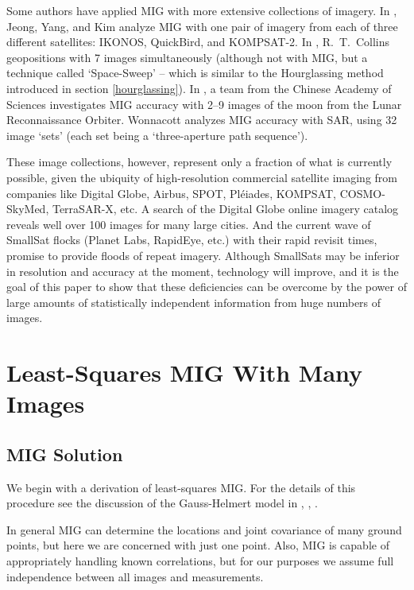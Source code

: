 \documentclass[10pt]{amsart}
\begin{document}
Some authors have applied MIG with more extensive collections of imagery. In
\cite{JEONG_SIX}, Jeong, Yang, and Kim analyze MIG with one pair of imagery from
each of three different satellites: IKONOS, QuickBird, and KOMPSAT-2. In
\cite{PLANE_COLLINS}, R.~T.~Collins geopositions with 7 images simultaneously
(although not with MIG, but a technique called `Space-Sweep' -- which is
similar to the Hourglassing method introduced in section \ref{hourglassing}).
In \cite{LRO_NINE}, a team from the Chinese Academy of Sciences investigates MIG
accuracy with 2--9 images of the moon from the Lunar Reconnaissance
Orbiter. Wonnacott \cite{WONNACOT_32_3} analyzes MIG accuracy with SAR, using 32
image `sets' (each set being a `three-aperture path sequence').

These image collections, however, represent only a fraction of what is currently
possible, given the ubiquity of high-resolution commercial satellite imaging
from companies like Digital Globe, Airbus, SPOT, Pl\'eiades, KOMPSAT,
COSMO-SkyMed, TerraSAR-X, etc. A search of the Digital Globe online imagery
catalog \cite{BROWSE_DG} reveals well over 100 images for many large cities. And
the current wave of SmallSat flocks (Planet Labs, RapidEye, etc.) with their
rapid revisit times, promise to provide floods of repeat imagery. Although
SmallSats may be inferior in resolution and accuracy at the moment, technology
will improve, and it is the goal of this paper to show that these deficiencies
can be overcome by the power of large amounts of statistically independent
information from huge numbers of images.

\section{Least-Squares MIG With Many Images}
\subsection{MIG Solution}\label{MIG}
We begin with a derivation of least-squares MIG. For the details of this
procedure see the discussion of the Gauss-Helmert model in \cite{LSQRMIG},
\cite{PHOTO_CV}, \cite{MANUAL}.

In general MIG can determine the locations and joint covariance of many ground
points, but here we are concerned with just one point. Also, MIG is capable of
appropriately handling known correlations, but for our purposes we assume full
independence between all images and measurements.
\end{document}
